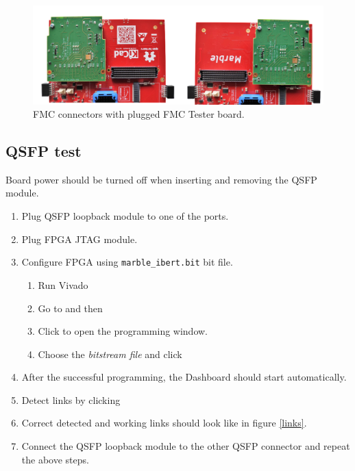 \documentclass[12pt,oneside,a4]{article}
\begin{document}
\begin{figure}[H]
\begin{center}
\includegraphics[width=0.9\linewidth]{fmc_tester.png}
 \caption{FMC connectors with plugged FMC Tester board.}
\end{center}
\end{figure}

\subsection{QSFP test}

\begin{leftbar}
Board power should be turned off when inserting and removing the QSFP module.
\end{leftbar}
\begin{enumerate}
	\item Plug QSFP loopback module to one of the ports.
	\item Plug FPGA JTAG module.
	\item Configure FPGA using \texttt{marble\_ibert.bit} bit file.
	\begin{enumerate}
		\item Run Vivado
		\item Go to  and then  
		\item Click  to open the programming window.
		\item Choose the \textit{bitstream file} and click 
	\end{enumerate}
	\item After the successful programming, the Dashboard should start automatically.
	\item Detect links by clicking 
	\item Correct detected and working links should look like in figure \ref{links}.
	\item Connect the QSFP loopback module to the other QSFP connector and repeat the above steps.
\end{enumerate}
\end{document}
